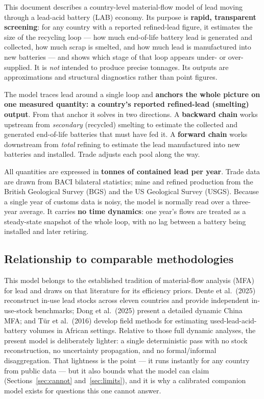 \documentclass[11pt,a4paper]{article}
\begin{document}
This document describes a country-level material-flow model of lead moving through a
lead-acid battery (LAB) economy. Its purpose is \textbf{rapid, transparent
screening}: for any country with a reported refined-lead figure, it estimates the
size of the recycling loop --- how much end-of-life battery lead is generated and
collected, how much scrap is smelted, and how much lead is manufactured into new
batteries --- and shows which stage of that loop appears under- or over-supplied. It
is \emph{not} intended to produce precise tonnages. Its outputs are approximations and
structural diagnostics rather than point figures.

The model traces lead around a single loop and \textbf{anchors the whole picture on
one measured quantity: a country's reported refined-lead (smelting) output}. From that
anchor it solves in two directions. A \textbf{backward chain} works upstream from
\emph{secondary} (recycled) smelting to estimate the collected and generated
end-of-life batteries that must have fed it. A \textbf{forward chain} works downstream
from \emph{total} refining to estimate the lead manufactured into new batteries and
installed. Trade adjusts each pool along the way.

All quantities are expressed in \textbf{tonnes of contained lead per year}. Trade data
are drawn from BACI bilateral statistics; mine and refined production from the British
Geological Survey (BGS) and the US Geological Survey (USGS). Because a single year of
customs data is noisy, the model is normally read over a three-year average. It carries
\textbf{no time dynamics}: one year's flows are treated as a steady-state snapshot of
the whole loop, with no lag between a battery being installed and later retiring.

\subsection{Relationship to comparable methodologies}

This model belongs to the established tradition of material-flow analysis (MFA) for
lead and draws on that literature for its efficiency priors. Dente et al.\ (2025)
reconstruct in-use lead stocks across eleven countries and provide independent
in-use-stock benchmarks; Dong et al.\ (2025) present a detailed dynamic China MFA; and
Tür et al.\ (2016) develop field methods for estimating used-lead-acid-battery volumes
in African settings. Relative to those full dynamic analyses, the present model is
deliberately lighter: a single deterministic pass with no stock reconstruction, no
uncertainty propagation, and no formal/informal disaggregation. That lightness is the
point --- it runs instantly for any country from public data --- but it also bounds
what the model can claim (Sections~\ref{sec:cannot} and~\ref{sec:limits}), and it is
why a calibrated companion model exists for questions this one cannot answer.
\end{document}
